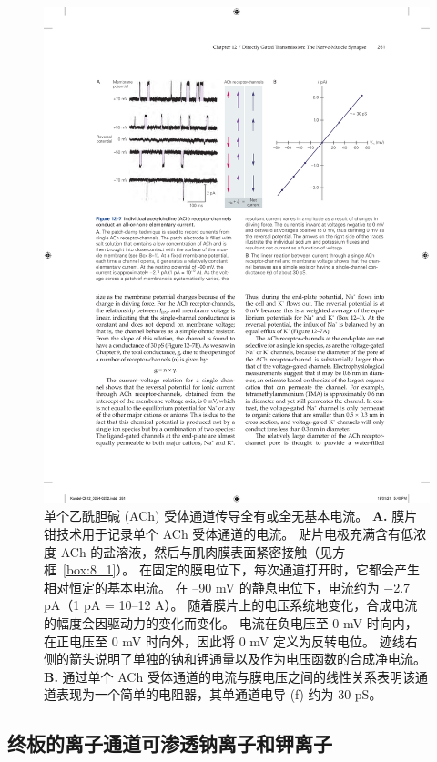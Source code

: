 \begin{figure}[htbp]
	\centering
	\includegraphics[width=0.9\linewidth]{chap12/fig_12_7}
	\caption{单个乙酰胆碱 (ACh) 受体通道传导全有或全无基本电流。 \textbf{A.} 膜片钳技术用于记录单个 ACh 受体通道的电流。
		贴片电极充满含有低浓度 ACh 的盐溶液，然后与肌肉膜表面紧密接触（见方框~\ref{box:8_1}）。
		在固定的膜电位下，每次通道打开时，它都会产生相对恒定的基本电流。
		在 –90 mV 的静息电位下，电流约为 −2.7 pA（1 pA = 10–12 A）。
		随着膜片上的电压系统地变化，合成电流的幅度会因驱动力的变化而变化。
		电流在负电压至 0 mV 时向内，在正电压至 0 mV 时向外，因此将 0 mV 定义为反转电位。
		迹线右侧的箭头说明了单独的钠和钾通量以及作为电压函数的合成净电流。
		\textbf{B.} 通过单个 ACh 受体通道的电流与膜电压之间的线性关系表明该通道表现为一个简单的电阻器，其单通道电导 (f) 约为 30 pS。}
	\label{fig:12_7}
\end{figure}



\subsection{终板的离子通道可渗透钠离子和钾离子}

